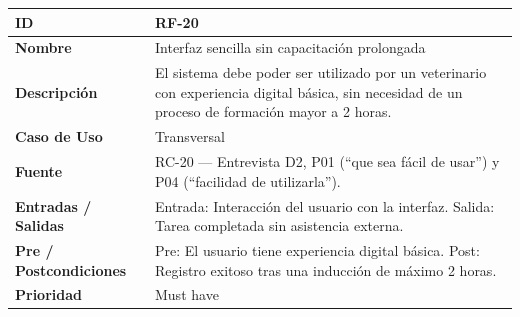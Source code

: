 \documentclass[
]{article}
\newcounter{none} %
\begin{document}
{\def\LTcaptype{none} %
\begin{longtable}[]{|
  >{\raggedright\arraybackslash}p{}|
  >{\raggedright\arraybackslash}p{}|}
\hline
\begin{minipage}[b]{\linewidth}\raggedright
\textbf{ID}
\end{minipage} & \begin{minipage}[b]{\linewidth}\raggedright
RF-20
\end{minipage} \\
\hline
\endhead
\hline
\endlastfoot
\textbf{Nombre} & \begin{minipage}[t]{\linewidth}\raggedright
Interfaz sencilla sin capacitación prolongada
\end{minipage} \\
\hline
\textbf{Descripción} & \begin{minipage}[t]{\linewidth}\raggedright
El sistema debe poder ser utilizado por un veterinario con experiencia digital básica, sin necesidad de un proceso de formación mayor a 2 horas.
\end{minipage} \\
\hline
\textbf{Caso de Uso} & \begin{minipage}[t]{\linewidth}\raggedright
Transversal
\end{minipage} \\
\hline
\textbf{Fuente} & \begin{minipage}[t]{\linewidth}\raggedright
RC-20 — Entrevista D2, P01 (“que sea fácil de usar”) y P04 (“facilidad de utilizarla”).
\end{minipage} \\
\hline
\textbf{Entradas / Salidas} & \begin{minipage}[t]{\linewidth}\raggedright
Entrada: Interacción del usuario con la interfaz. Salida: Tarea completada sin asistencia externa.
\end{minipage} \\
\hline
\textbf{Pre / Postcondiciones} & \begin{minipage}[t]{\linewidth}\raggedright
Pre: El usuario tiene experiencia digital básica. Post: Registro exitoso tras una inducción de máximo 2 horas.
\end{minipage} \\
\hline
\textbf{Prioridad} & \begin{minipage}[t]{\linewidth}\raggedright
Must have
\end{minipage} \\

\end{longtable}}
\end{document}
